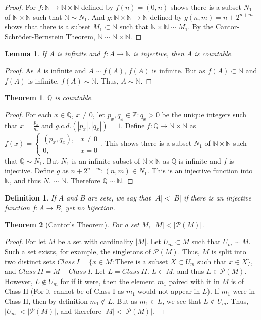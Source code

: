 \documentclass[crop=false,class=book]{standalone}
\theoremstyle{mystyle}
\newtheorem{theorem}{Theorem}[section]
\newtheorem{definition}{Definition}[section]
\newtheorem{lemma}{Lemma}[section]
\begin{document}
\begin{proof}
For $f:\mathbb{N} \rightarrow \mathbb{N}\times \mathbb{N}$ defined by $f(n) = (0,n)$ shows there is a subset $N_1$ of $\mathbb{N} \times \mathbb{N}$ such that $\mathbb{N}\sim N_1$. And $g:\mathbb{N}\times \mathbb{N} \rightarrow \mathbb{N}$ defined by $g(n,m) =n+2^{n+m}$ shows that there is a subset $M_1 \subset \mathbb{N}$ such that $\mathbb{N} \times \mathbb{N} \sim M_1$. By the Cantor-Schr\"{o}der-Bernstein Theorem, $\mathbb{N} \sim \mathbb{N}\times \mathbb{N}$.
\end{proof}
\begin{lemma}
If $A$ is infinite and $f:A\rightarrow \mathbb{N}$ is injective, then $A$ is countable.
\end{lemma}
\begin{proof}
As $A$ is infinite and $A\sim f(A)$, $f(A)$ is infinite. But as $f(A)\subset \mathbb{N}$ and $f(A)$ is infinite, $f(A)\sim \mathbb{N}$. Thus, $A\sim \mathbb{N}$. 
\end{proof}
\begin{theorem}
$\mathbb{Q}$ is countable.
\end{theorem}
\begin{proof}
For each $x\in \mathbb{Q}$, $x\ne 0$, let $p_x,q_x\in\mathbb{Z}:q_x>0$ be the unique integers such that $x = \frac{p_x}{q_x}$ and $g.c.d.(|p_x|,|q_x|)=1$. Define $f:\mathbb{Q}\rightarrow \mathbb{N}\times \mathbb{N}$ as $f(x) = \begin{cases}(p_x,q_x), & x\ne 0 \\ 0, & x=0\end{cases}$. This shows there is a subset $N_1$ of $\mathbb{N}\times \mathbb{N}$ such that $\mathbb{Q}\sim N_1$. But $N_1$ is an infinite subset of $\mathbb{N}\times\mathbb{N}$ as $\mathbb{Q}$ is infinite and $f$ is injective. Define $g$ as $n+2^{n+m}:(n,m)\in N_1$. This is an injective function into $\mathbb{N}$, and thus $N_1 \sim \mathbb{N}$. Therefore $\mathbb{Q}\sim \mathbb{N}$.
\end{proof}
\begin{definition}
If $A$ and $B$ are sets, we say that $|A|<|B|$ if there is an injective function $f:A\rightarrow B$, yet no bijection.
\end{definition}
\begin{theorem}[Cantor's Theorem]
For a set $M$, $|M|<|\mathcal{P}(M)|$.
\end{theorem}
\begin{proof}
For let $M$ be a set with cardinality $|M|$. Let $U_m \subset M$ such that $U_m \sim M$. Such a set exists, for example, the singletons of $\mathcal{P}(M)$. Thus, $M$ is split into two distinct sets $Class\ I=\{x\in M: \textrm{There is a subset } X\subset U_m\textrm{ such that }x\in X\}$, and $Class\ II=M-Class\ I$. Let $L = Class\ II$. $L\subset M$, and thus $L\in \mathcal{P}(M)$. However, $L \notin U_m$ for if it were, then the element $m_1$ paired with it in $M$ is of Class II (For it cannot be of Class I as $m_1$ would not appear in $L$). If $m_1$ were in Class II, then by definition $m_1 \notin L$. But as $m_1 \in L$, we see that $L\notin U_m$. Thus, $|U_m| <|\mathcal{P}(M)|$, and therefore $|M|<|\mathcal{P}(M)|$.
\end{proof}
\end{document}
